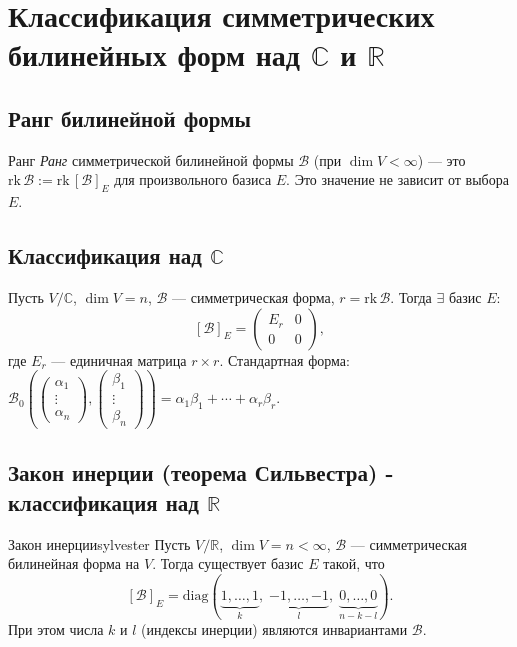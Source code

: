 \section{Классификация симметрических билинейных форм над $\mathbb{C}$ и $\mathbb{R}$}

\subsection*{Ранг билинейной формы}

\begin{Definition}{Ранг}{}
	\textit{Ранг} симметрической билинейной формы $\mathcal{B}$ (при $\dim V < \infty$) — это $\mathrm{rk}\,\mathcal{B} := \mathrm{rk}\,[\mathcal{B}]_E$ для произвольного базиса $E$.
	Это значение не зависит от выбора $E$.
\end{Definition}

\subsection*{Классификация над $\mathbb{C}$}

\begin{Corollary}{}{}
	Пусть $V/\mathbb{C}$, $\dim V = n$, $\mathcal{B}$ — симметрическая форма, $r = \mathrm{rk}\,\mathcal{B}$.
	Тогда $\exists$ базис $E\colon$
	\[
	[\mathcal{B}]_E = \begin{pmatrix} E_r & 0 \\ 0 & 0 \end{pmatrix},
	\]
	где $E_r$ — единичная матрица $r \times r$.
	Стандартная форма: $\mathcal{B}_0\!\left(\begin{pmatrix}\alpha_1\\\vdots\\\alpha_n\end{pmatrix},\begin{pmatrix}\beta_1\\\vdots\\\beta_n\end{pmatrix}\right) = \alpha_1\beta_1 + \cdots + \alpha_r\beta_r$.
\end{Corollary}

\subsection*{Закон инерции (теорема Сильвестра) - классификация над $\mathbb{R}$}

\begin{Theorem}{Закон инерции}{sylvester}
	Пусть $V/\mathbb{R}$, $\dim V = n < \infty$, $\mathcal{B}$ — симметрическая билинейная форма на $V$.
	Тогда существует базис $E$ такой, что
	\[
	[\mathcal{B}]_E = \mathrm{diag}(\underbrace{1,\ldots,1}_{k},\;
	\underbrace{-1,\ldots,-1}_{l},\;
	\underbrace{0,\ldots,0}_{n-k-l}). \tag{$*$}
	\] 
	При этом числа $k$ и $l$ (индексы инерции) являются инвариантами $\mathcal{B}$.
\end{Theorem}

